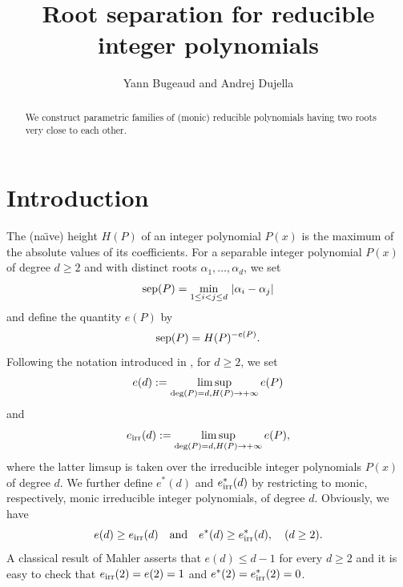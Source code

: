 \documentclass [11pt] {article}
\def\sep{{\rm sep}}
\begin{document}
\title{{\Large{\bf Root separation for reducible integer polynomials}}}

\author{Yann Bugeaud and Andrej Dujella}


\date{}
\maketitle


\begin{abstract}
We construct parametric families of (monic) reducible polynomials
having two roots very close to each other.
\end{abstract}


\section{Introduction}

The (na\"\i ve) height $H(P)$ of  an integer
polynomial $P(x)$ is
the maximum of the absolute values of its
coefficients.
For a separable
integer polynomial $P(x)$ of degree $d \ge 2$
and with distinct roots $\alpha_1, \ldots , \alpha_d$,
we set
$$
\sep(P) = \min_{1 \le i < j \le d} \, |\alpha_i - \alpha_j|
$$
and define the quantity $e(P)$ by
$$
\sep(P) = H(P)^{-e(P)}.
$$
Following the notation introduced in \cite{BM2}, for $d \ge 2$, we set
$$
e(d) := \limsup_{{\rm deg}(P) = d, H(P) \to + \infty} e(P)
$$
and
$$
e_{{\rm irr}} (d) := \limsup_{{\rm deg}(P) = d, H(P) \to + \infty} e(P),
$$
where the latter limsup is taken over the irreducible integer polynomials
$P(x)$ of degree $d$.
We further define
$e^*(d)$ and $e_{{\rm irr}}^*(d)$ by restricting to
monic, respectively, monic irreducible integer polynomials, of degree $d$.
Obviously, we have
$$
e(d) \ge e_{{\rm irr}}(d) \quad \mbox{and} \quad
e^*(d) \ge e_{{\rm irr}}^*(d), \quad (d \ge 2).
$$
A classical result of Mahler \cite{Mah64}
asserts that $e(d) \le d-1$ for every $d \ge 2$
and it is easy to check that $e_{{\rm irr}}(2)=e(2)=1$
and $e^*(2)=e_{{\rm irr}}^*(2) = 0$.
\end{document}

